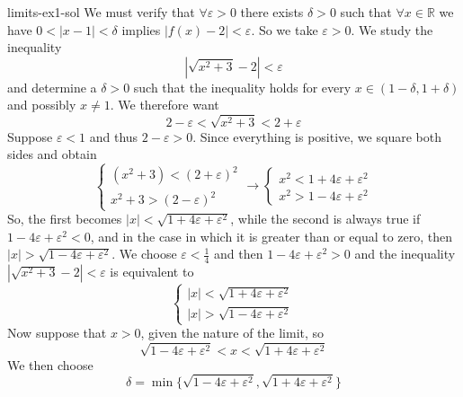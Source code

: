 \documentclass[preview]{standalone}
\begin{document}
\begin{snippetsolution}{limits-ex1-sol}{}
    We must verify that \(\forall \varepsilon > 0\) there exists \(\delta>0\)
    such that \(\forall x \in \mathbb{R}\) we have \(0<|x-1|<\delta\)
    implies \(|f(x) - 2| < \varepsilon\).
    So we take \(\varepsilon > 0\).
    We study the inequality
    \[
        |\sqrt{x^2 + 3} - 2| < \varepsilon
    \]
    and determine a \(\delta > 0\) such that the inequality holds for every \(x \in (1-\delta, 1 + \delta)\)
    and possibly \(x \neq 1\).
    We therefore want
    \[
        2 - \varepsilon < \sqrt{x^2 + 3} < 2 + \varepsilon
    \]
    Suppose \(\varepsilon < 1\) and thus \(2-\varepsilon>0\).
    Since everything is positive, we square both sides and obtain
    \[
        \begin{cases}
            (x^2 + 3) < {(2 + \varepsilon)}^2 \\
            x^2 + 3 > {(2 - \varepsilon)}^2
        \end{cases}
        \rightarrow
        \begin{cases}
            x^2 < 1 + 4\varepsilon + \varepsilon^2 \\
            x^2 > 1 - 4\varepsilon + \varepsilon^2
        \end{cases}
    \]
    So, the first becomes \(|x| < \sqrt{1 + 4\varepsilon + \varepsilon^2}\),
    while the second is always true if \(1-4\varepsilon+\varepsilon^2 < 0\),
    and in the case in which it is greater than or equal to zero, then \(|x|>\sqrt{1-4\varepsilon+\varepsilon^2}\).
    We choose \(\varepsilon<\frac{1}{4}\) and then \(1 - 4\varepsilon + \varepsilon^2 > 0\)
    and the inequality \(|\sqrt{x^2 +3} - 2| < \varepsilon\)
    is equivalent to
    \[
        \begin{cases}
            |x| < \sqrt{1 + 4\varepsilon + \varepsilon^2} \\
            |x| > \sqrt{1 - 4\varepsilon + \varepsilon^2}
        \end{cases}
    \]
    Now suppose that \(x>0\), given the nature of the limit, so
    \[
        \sqrt{1 - 4\varepsilon + \varepsilon^2} < x < \sqrt{1 + 4\varepsilon + \varepsilon^2}
    \]
    We then choose
    \[
        \delta = \min\{\sqrt{1 - 4\varepsilon + \varepsilon^2}, \sqrt{1 + 4\varepsilon + \varepsilon^2}\}
    \]
\end{snippetsolution}
\end{document}
